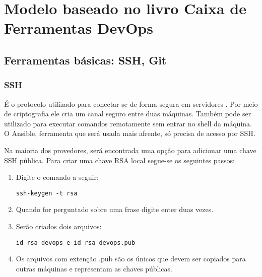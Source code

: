 

 

\section{Modelo baseado no livro Caixa de Ferramentas DevOps}

\subsection{Ferramentas básicas: SSH, Git}

\subsubsection{SSH}

É o protocolo utilizado para conectar-se de forma 
segura em servidores \cite{barret2005ssh}.
Por meio de criptografia ele cria um canal
seguro entre duas máquinas. Também 
pode ser utilizado para executar comandos 
remotamente sem entrar no shell da máquina.
O Ansible, ferramenta que será usada mais afrente, 
só precisa de acesso por SSH.

Na maioria dos provedores, será encontrada uma 
opção para adicionar uma chave SSH pública.
Para criar uma chave RSA local segue-se os 
seguintes passos:
 \begin{enumerate}
   \item Digite o comando a seguir:
	
      \begin{lstlisting}
ssh-keygen -t rsa
      \end{lstlisting}
   
   \item Quando for perguntado sobre uma frase digite 
      enter duas vezes.
    \item Serão criados dois arquivos:
    \begin{lstlisting}
id_rsa_devops e id_rsa_devops.pub
    \end{lstlisting}
    
    \item Os arquivos com extenção .pub são os únicos 
	  que devem ser copiados para outras máquinas 
	  e representam as chaves públicas.

 \end{enumerate} 
